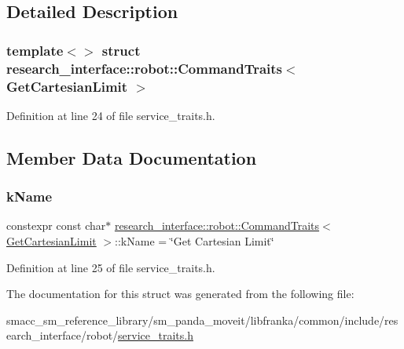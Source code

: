 \subsection{Detailed Description}
\subsubsection*{template$<$$>$\newline
struct research\+\_\+interface\+::robot\+::\+Command\+Traits$<$ Get\+Cartesian\+Limit $>$}



Definition at line 24 of file service\+\_\+traits.\+h.



\subsection{Member Data Documentation}
\mbox{\label{structresearch__interface_1_1robot_1_1CommandTraits_3_01GetCartesianLimit_01_4_af357a46f60e7eec9873ff36151c536bd}} 
\subsubsection{\texorpdfstring{k\+Name}{kName}}
{\footnotesize\ttfamily constexpr const char$\ast$ \hyperlink{structresearch__interface_1_1robot_1_1CommandTraits}{research\+\_\+interface\+::robot\+::\+Command\+Traits}$<$ \hyperlink{structresearch__interface_1_1robot_1_1GetCartesianLimit}{Get\+Cartesian\+Limit} $>$\+::k\+Name = \char`\"{}Get Cartesian Limit\char`\"{}\hspace{0.3cm}{\ttfamily [static]}}



Definition at line 25 of file service\+\_\+traits.\+h.



The documentation for this struct was generated from the following file\+:\begin{DoxyCompactItemize}
\item 
smacc\+\_\+sm\+\_\+reference\+\_\+library/sm\+\_\+panda\+\_\+moveit/libfranka/common/include/research\+\_\+interface/robot/\hyperlink{service__traits_8h}{service\+\_\+traits.\+h}\end{DoxyCompactItemize}
